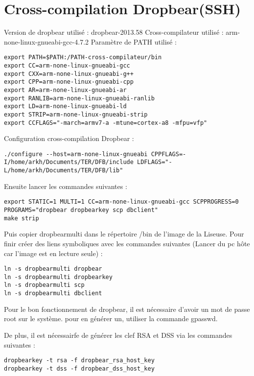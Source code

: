 \section {Cross-compilation Dropbear(SSH)}
Version de dropbear utilisé : dropbear-2013.58
Cross-compilateur utilisé : arm-none-linux-gnueabi-gcc-4.7.2
Paramètre de PATH utilisé :

\begin{lstlisting}
export PATH=$PATH:/PATH-cross-compilateur/bin
export CC=arm-none-linux-gnueabi-gcc
export CXX=arm-none-linux-gnueabi-g++
export CPP=arm-none-linux-gnueabi-cpp
export AR=arm-none-linux-gnueabi-ar
export RANLIB=arm-none-linux-gnueabi-ranlib
export LD=arm-none-linux-gnueabi-ld
export STRIP=arm-none-linux-gnueabi-strip
export CCFLAGS="-march=armv7-a -mtune=cortex-a8 -mfpu=vfp"
\end{lstlisting}

Configuration cross-compilation Dropbear : 

\begin{lstlisting}
./configure --host=arm-none-linux-gnueabi CPPFLAGS=-I/home/arkh/Documents/TER/DFB/include LDFLAGS="-L/home/arkh/Documents/TER/DFB/lib"
\end{lstlisting}

Ensuite lancer les commandes suivantes :

\begin{lstlisting}
export STATIC=1 MULTI=1 CC=arm-none-linux-gnueabi-gcc SCPPROGRESS=0 PROGRAMS="dropbear dropbearkey scp dbclient"
make strip
\end{lstlisting}

Puis copier dropbearmulti dans le répertoire /bin de l'image de la Liseuse. Pour finir créer des liens symboliques avec les commandes suivantes (Lancer du pc hôte car l'image est en lecture seule) :

\begin{lstlisting}
ln -s dropbearmulti dropbear
ln -s dropbearmulti dropbearkey
ln -s dropbearmulti scp
ln -s dropbearmulti dbclient
\end{lstlisting}

Pour le bon fonctionnement de dropbear, il est nécessaire d'avoir un mot de passe root sur le système. pour en générer un, utiliser la commande gpasswd.

De plus, il est nécessairfe de générer les clef RSA et DSS via les commandes suivantes : 

\begin{lstlisting}
dropbearkey -t rsa -f dropbear_rsa_host_key
dropbearkey -t dss -f dropbear_dss_host_key
\end{lstlisting}

